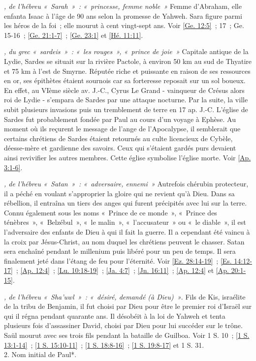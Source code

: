 \begin{multicols}{2}
\textit{, de l'hébreu «~Sarah~»~: «~princesse, femme noble~»}\newline
Femme d'Abraham, elle enfanta Isaac à l'âge de 90 ans selon la promesse de Yahweh. Sara figure parmi les héros de la foi~; elle mourut à cent vingt-sept ans.\newline
Voir \vref{Ge. 12:5}~; 17~; Ge. 15-16~; \vref{Ge. 21:1-7}~; \vref{Ge. 23:1} et \vref{Hé. 11:11}.

\textit{, du grec «~sardeis~»~: «~les rouges~», «~prince de joie~»}\newline
Capitale antique de la Lydie, Sardes se situait sur la rivière Pactole, à environ 50 km au sud de Thyatire et 75 km à l'est de Smyrne. Réputée riche et puissante en raison de ses ressources en or, ses épithètes étaient sournois car sa forteresse reposait sur un sol boueux. En effet, au VIème siècle av. J.-C., Cyrus Le Grand - vainqueur de Crésus alors roi de Lydie - s'empara de Sardes par une attaque nocturne. Par la suite, la ville subit plusieurs invasions puis un tremblement de terre en 17 ap. J.-C. L'église de Sardes fut probablement fondée par Paul au cours d'un voyage à Ephèse. Au moment où ils reçurent le message de l'ange de l'Apocalypse, il semblerait que certains chrétiens de Sardes étaient retournés au culte licencieux de Cybèle, déesse-mère et gardienne des savoirs. Ceux qui s'étaient gardés purs devaient ainsi revivifier les autres membres. Cette église symbolise l'église morte. Voir \vref{Ap. 3:1-6}.

\textit{, de l'hébreu «~Satan~»~: «~adversaire, ennemi~»}\newline
Autrefois chérubin protecteur, il a péché en voulant s'approprier la gloire qui ne revient qu'à Dieu. Dans sa rébellion, il entraîna un tiers des anges qui furent précipités avec lui sur la terre. Connu également sous les noms «~Prince de ce monde~», «~Prince des ténèbres~», «~Belzébul~», «~le malin~», «~l'accusateur~» ou «~le diable~», il est l'adversaire des enfants de Dieu à qui il fait la guerre. Il a cependant été vaincu à la croix par Jésus-Christ, au nom duquel les chrétiens peuvent le chasser. Satan sera enchaîné pendant le millenium puis libéré pour un peu de temps. Il sera finalement jeté dans l'étang de feu pour l'éternité.\newline
Voir \vref{Ez. 28:14-19}~; \vref{Es. 14:12-17}~; \vref{Ap. 12:4}~; \vref{Lu. 10:18-19}~; \vref{Ja. 4:7}~; \vref{Jn. 16:11}~; \vref{Ap. 12:4} et \vref{Ap. 20:1-15}.

\textit{, de l'hébreu «~Sha'uwl~»~: «~désiré, demandé (à Dieu)~»}. Fils de Kis, israélite de la tribu de Benjamin, il fut choisi par Dieu pour être le premier roi d'Israël sur qui il régna pendant quarante ans. Il désobéit à la loi de Yahweh et tenta plusieurs fois d'assassiner David, choisi par Dieu pour lui succéder sur le trône. Saül mourut avec ses trois fils pendant la bataille de Guilboa. Voir 1 S. 10~; \vref{1 S. 13:1-14}~; \vref{1 S. 15:10-11}~; \vref{1 S. 18:8-16}~; \vref{1 S. 19:8-17} et 1 S. 31.
\\2. Nom initial de Paul*.


\end{multicols}
